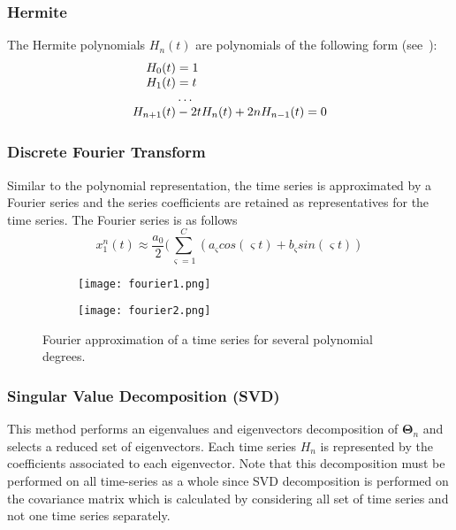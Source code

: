 \subsubsection{Hermite}
\label{sec:Hermite}

The Hermite polynomials $H_n(t)$ are polynomials of the following form (see~\cite{}):
\begin{equation}
\begin{array}{r@{}l}
  H_0(t)&{}=1 \\
  H_1(t)&{}=t \\
        &{}\ldots \\
  H_{n+1}(t)&{}-2 t H_n(t)+2 n H_{n-1}(t)=0
  \label{eq:HermitePolynomialCoeffs}
\end{array}
\end{equation}

\subsubsection{Discrete Fourier Transform}
\label{sec:fourier}

Similar to the polynomial representation, the time series is approximated by a Fourier series and the series coefficients 
are retained as representatives for the time series. The Fourier series is as follows 
\begin{equation}
  x_1^n(t) \approx \frac{a_0}{2} (\sum_{\varsigma=1}^{C} (a_\varsigma cos(\varsigma t) + b_\varsigma sin(\varsigma t)) 
  \label{eq:fourier}
\end{equation}

\begin{figure}
  \begin{subfigure}{.5\linewidth}
    \centering
    \texttt{[image: fourier1.png]}
  \end{subfigure}%
  \begin{subfigure}{.5\linewidth}
    \centering
    \texttt{[image: fourier2.png]}
  \end{subfigure}
  \caption{Fourier approximation of a time series for several polynomial degrees.}
  \label{fig:fourier}
\end{figure}

\subsubsection{Singular Value Decomposition (SVD)}
\label{sec:svd}

This method performs an eigenvalues and eigenvectors decomposition of $\bm{\Theta}_n$ and selects a reduced set of eigenvectors. 
Each time series $Η_n$ is represented by the coefficients associated to each eigenvector. 
Note that this decomposition must be performed on all time-series as a whole since SVD decomposition is performed 
on the covariance matrix which is calculated by considering all set of time series and not one time series separately. 

